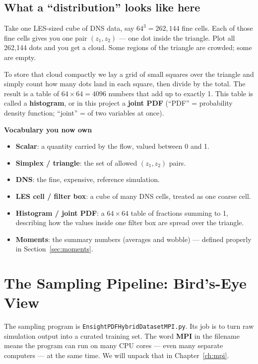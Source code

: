 \documentclass[11pt,a4paper]{report}
\newcommand{\code}[1]{\texttt{#1}}
\newcommand{\term}[1]{\textbf{#1}}
\renewcommand{\_}{\origtextunderscore\allowbreak}
\newlength{\calloutwidth}
\newcommand{\calloutOpen}{%
  \par\medskip\noindent
  \setlength{\calloutwidth}{\dimexpr\linewidth-2\fboxsep\relax}%
  \begin{lrbox}{\calloutbox}\begin{minipage}{\calloutwidth}}
\newcommand{\calloutClose}[1]{%
  \end{minipage}\end{lrbox}\colorbox{#1}{\usebox{\calloutbox}}\par\medskip}
\newenvironment{plainbox}[1]
  {\calloutOpen\textbf{#1}\par\medskip}
  {\calloutClose{BoxBG}}
\begin{document}
\section{What a ``distribution'' looks like here}

Take one LES-sized cube of DNS data, say $64^3 = 262{,}144$ fine cells. Each of those fine
cells gives you one pair $(z_1, z_2)$ --- one dot inside the triangle. Plot all 262{,}144 dots
and you get a cloud. Some regions of the triangle are crowded; some are empty.

To store that cloud compactly we lay a grid of small squares over the triangle and simply
count how many dots land in each square, then divide by the total. The result is a table of
$64 \times 64 = 4096$ numbers that add up to exactly 1. This table is called a
\term{histogram}, or in this project a \term{joint PDF} (``PDF'' = probability density function;
``joint'' = of two variables at once).

\begin{plainbox}{Vocabulary you now own}
\begin{itemize}
  \item \term{Scalar}: a quantity carried by the flow, valued between 0 and 1.
  \item \term{Simplex / triangle}: the set of allowed $(z_1, z_2)$ pairs.
  \item \term{DNS}: the fine, expensive, reference simulation.
  \item \term{LES cell / filter box}: a cube of many DNS cells, treated as one coarse cell.
  \item \term{Histogram / joint PDF}: a $64\times64$ table of fractions summing to 1, describing
        how the values inside one filter box are spread over the triangle.
  \item \term{Moments}: the summary numbers (averages and wobble) --- defined properly in
        Section~\ref{sec:moments}.
\end{itemize}
\end{plainbox}

\chapter{The Sampling Pipeline: Bird's-Eye View}
\label{ch:sampling-overview}

The sampling program is \code{EnsightPDFHybridDatasetMPI.py}. Its job is to turn raw
simulation output into a curated training set. The word \term{MPI} in the filename means the
program can run on many CPU cores --- even many separate computers --- at the same time.
We will unpack that in Chapter~\ref{ch:mpi}.
\end{document}
